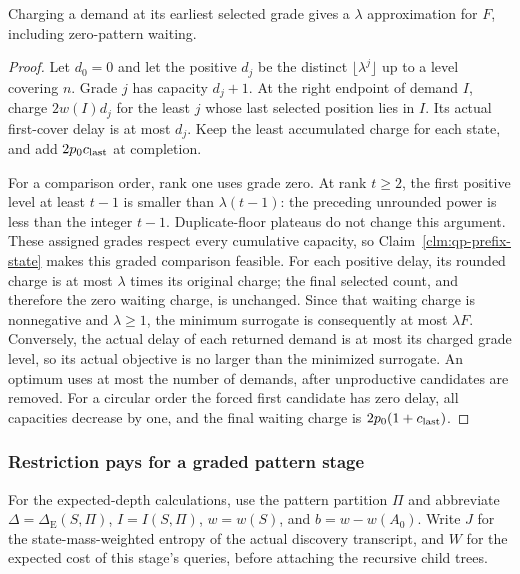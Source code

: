 \begin{claim}
\label{clm:qp-rounded-delay}
Charging a demand at its earliest selected grade gives a
$\lambda$ approximation for $F$, including zero-pattern waiting.
\end{claim}
\begin{proof}
Let $d_0=0$ and let the positive $d_j$ be the distinct
$\lfloor\lambda^j\rfloor$ up to a level covering $n$. Grade $j$
has capacity $d_j+1$. At the right endpoint of demand $I$, charge
$2w(I)d_j$ for the least $j$ whose last selected position lies in
$I$. Its actual first-cover delay is at most $d_j$. Keep the least
accumulated charge for each state, and add $2p_0c_{\rm last}$ at
completion.

For a comparison order, rank one uses grade zero. At rank $t\ge2$,
the first positive level at least $t-1$ is smaller than
$\lambda(t-1)$: the preceding unrounded power is less than the
integer $t-1$. Duplicate-floor plateaus do not change this argument.
These assigned grades respect every cumulative capacity, so
Claim~\ref{clm:qp-prefix-state} makes this graded comparison feasible.
For each positive delay, its rounded charge is at most $\lambda$
times its original charge; the final selected count, and therefore
the zero waiting charge, is unchanged. Since that waiting charge is
nonnegative and $\lambda\ge1$, the minimum surrogate is consequently
at most $\lambda F$. Conversely, the actual delay of each returned
demand is at most its charged grade level, so its actual objective
is no larger than the minimized surrogate.
An optimum uses at most the number of demands, after unproductive
candidates are removed. For a circular order the forced first
candidate has zero delay, all capacities decrease by one, and the
final waiting charge is $2p_0(1+c_{\rm last})$.
\end{proof}



\subsubsection{Restriction pays for a graded pattern stage}

For the expected-depth calculations, use the pattern partition $\Pi$
and abbreviate $\Delta=\Delta_{\mathrm E}(S,\Pi)$,
$I=I(S,\Pi)$, $w=w(S)$, and $b=w-w(A_0)$.
Write $J$ for the state-mass-weighted entropy of the actual discovery
transcript, and $W$ for the expected cost of this stage's queries,
before attaching the recursive child trees.

